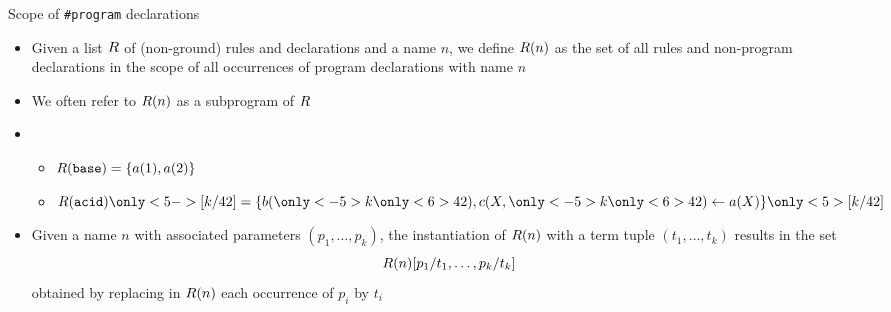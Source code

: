 \begin{frame}{Scope of \texttt{\#program} declarations}
  \begin{itemize}
  \item <1->
    Given a list $R$ of (non-ground) rules and declarations and a name $n$,
    we define $R(n)$ as the set of all rules and non-program declarations
    in the scope of all occurrences of program declarations with name $n$
  \item <2->
    We often refer to $R(n)$ as a subprogram of $R$
    \medskip
  \item <3->  \
    \begin{itemize}\normalsize
    \item \(
      R(\texttt{base})=\{a(1),a(2)\}
      \)
      \smallskip
    \item
      \(
      \RRG(\texttt{acid})\only<5->{[k/42]}=\{b(\only<-5>{k}\only<6>{42}), c(X,\only<-5>{k}\only<6>{42})\leftarrow a(X)\}\only<5>{[k/42]}
      \)
    \end{itemize}
      \smallskip
  \item <4->
    Given a name $n$ with associated parameters $(p_1,\dots,p_k)$,
    the instantiation of $R(n)$ with a term tuple $(t_1,\dots,t_k)$
    results in the set
    \[
    R(n)[p_1/t_1,\dots,p_k/t_k]
    \]
    obtained by replacing in $R(n)$ each occurrence of $p_i$ by $t_i$ %
  \end{itemize}
\end{frame}

